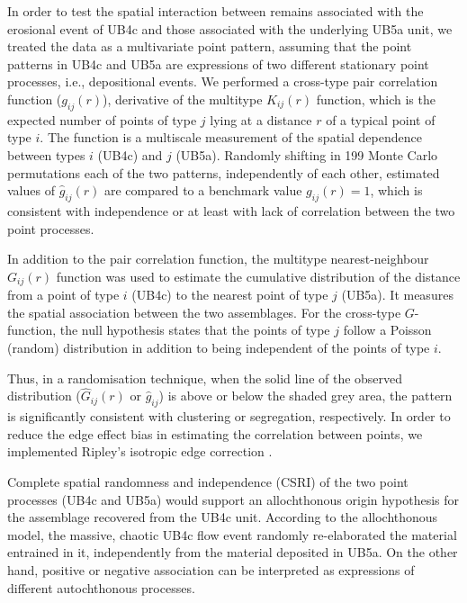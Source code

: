 \documentclass[preprint,authoryear,times]{elsarticle} %
\begin{document}
In order to test the spatial interaction between remains associated with the erosional event of UB4c and those associated with the underlying UB5a unit, we treated the data as a multivariate point pattern, assuming that the point patterns in UB4c and UB5a are expressions of two different stationary point processes, i.e., depositional events. We performed a cross-type pair correlation function ($g_{ij}(r)$), derivative of the multitype $K_{ij}(r)$ function, which is the expected number of points of type $j$ lying at a distance $r$ of a typical point of type $i$. The function is a multiscale measurement of the spatial dependence between types $i$ (UB4c) and $j$ (UB5a). Randomly shifting in 199 Monte Carlo permutations each of the two patterns, independently of each other, estimated values of $\hat{g}_{ij}(r)$ are compared to a benchmark value $g_{ij}(r)=1$, which is consistent with independence or at least with lack of correlation between the two point processes.

In addition to the pair correlation function, the multitype nearest-neighbour $G_{ij}(r)$ function was used to estimate the cumulative distribution of the distance from a point of type $i$ (UB4c) to the nearest point of type $j$ (UB5a). It measures the spatial association between the two assemblages. For the cross-type $G$-function, the null hypothesis states that the points of type $j$ follow a Poisson (random) distribution in addition to being independent of the points of type $i$.

Thus, in a randomisation technique, when the solid line of the observed distribution ($\hat{G}_{ij}(r)$ or $\hat{g}_{ij}$) is above or below the shaded grey area, the pattern is significantly consistent with clustering or segregation, respectively. In order to reduce the edge effect bias in estimating the correlation between points, we implemented Ripley's isotropic edge correction \citep{Ohser1983,Ripley1988}.

Complete spatial randomness and independence (CSRI) of the two point processes (UB4c and UB5a) would support an allochthonous origin hypothesis for the assemblage recovered from the UB4c unit. According to the allochthonous model, the massive, chaotic UB4c flow event randomly re-elaborated the material entrained in it, independently from the material deposited in UB5a. On the other hand, positive or negative association can be interpreted as expressions of different autochthonous processes.

\end{document}
